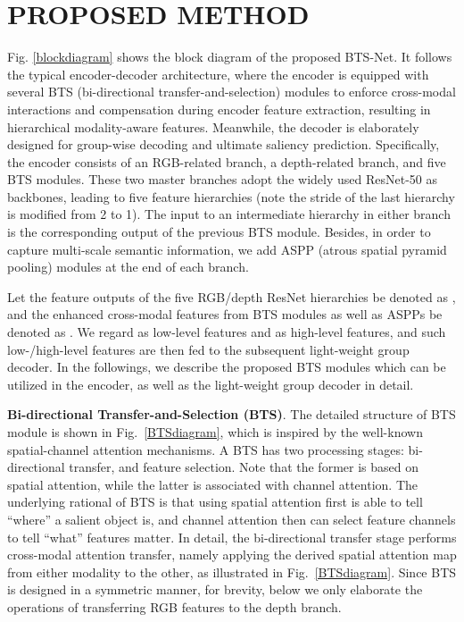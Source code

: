 \documentclass{article}
\begin{document}
\section{PROPOSED METHOD}\label{sec:method}
\vspace{-0.2cm}
Fig. \ref{blockdiagram} shows the block diagram of the proposed BTS-Net. It follows the typical encoder-decoder architecture, where the encoder is equipped with several BTS (bi-directional transfer-and-selection) modules to enforce cross-modal interactions and compensation during encoder feature extraction, resulting in hierarchical modality-aware features. Meanwhile, the decoder is elaborately designed for group-wise decoding and ultimate saliency prediction.
Specifically, the encoder consists of an RGB-related branch, a depth-related branch, and five BTS modules. These two master branches adopt the widely used ResNet-50\cite{ResNet} as backbones, leading to five feature hierarchies (note the stride of the last hierarchy is modified from 2 to 1). The input to an intermediate hierarchy in either branch is the corresponding output of the previous BTS module. Besides, in order to capture multi-scale semantic information, we add ASPP (atrous spatial pyramid pooling\cite{ASPP}) modules at the end of each branch. 

Let the feature outputs of the five RGB/depth ResNet hierarchies be denoted as , and the enhanced cross-modal features from BTS modules as well as ASPPs be denoted as . We regard  as low-level features and  as high-level features, and such low-/high-level features are then fed to the subsequent light-weight group decoder. In the followings, we describe the proposed BTS modules which can be utilized in the encoder, as well as the light-weight group decoder in detail.

\textbf{Bi-directional Transfer-and-Selection (BTS)}. The detailed structure of BTS module is shown in Fig.~\ref{BTSdiagram}, which is inspired by the well-known spatial-channel attention mechanisms\cite{CBAM}. A BTS has two processing stages: bi-directional transfer, and feature selection. Note that the former is based on spatial attention, while the latter is associated with channel attention. The underlying rational of BTS is that using spatial attention first is able to tell ``where'' a salient object is, and channel attention then can select feature channels to tell ``what'' features matter. In detail, the bi-directional transfer stage performs cross-modal attention transfer, namely applying the derived spatial attention map from either modality to the other, as illustrated in Fig.~\ref{BTSdiagram}. Since BTS is designed in a symmetric manner, for brevity, below we only elaborate the operations of transferring RGB features to the depth branch.
\end{document}
